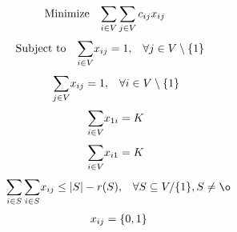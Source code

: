 \vspace{0.5cm}

\begin{equation}
    \begin{array}{ll@{}ll}
        \text{Minimize} & \displaystyle\sum\limits_{i \in V}\sum\limits_{j \in V} c_{ij}&x_{ij} &\\
    \end{array}
\end{equation}
\begin{equation}
    \begin{array}{ll@{}ll}
        \text{Subject to}&\displaystyle\sum\limits_{i \in V}   &x_{ij} = 1,  &\forall j \in V \setminus \{1\}\\
    \end{array}
\end{equation}
\begin{equation}
    \begin{array}{ll@{}ll}
        & \displaystyle\sum\limits_{j \in V}   &x_{ij} = 1,  &\forall i \in V \setminus \{1\}\\
    \end{array}
\end{equation}
\begin{equation}
    \begin{array}{ll@{}ll}
        & \displaystyle\sum\limits_{i \in V}   &x_{1i} = K\\
    \end{array}
\end{equation}
\begin{equation}
    \begin{array}{ll@{}ll}
        & \displaystyle\sum\limits_{i \in V}   &x_{i1} = K\\
    \end{array}
\end{equation}
\begin{equation}
    \begin{array}{ll@{}ll@{}ll}
        & \displaystyle\sum\limits_{i \in S}\sum\limits_{i \in S}  &x_{ij} \leq |S| - r(S), &\forall S \subseteq V/ \{1\} , S \neq \o \\
    \end{array}
\end{equation}
\begin{equation}
    \begin{array}{ll@{}ll@{}ll}
        & x_{ij} = \{0,1\}\\
    \end{array}
\end{equation}
